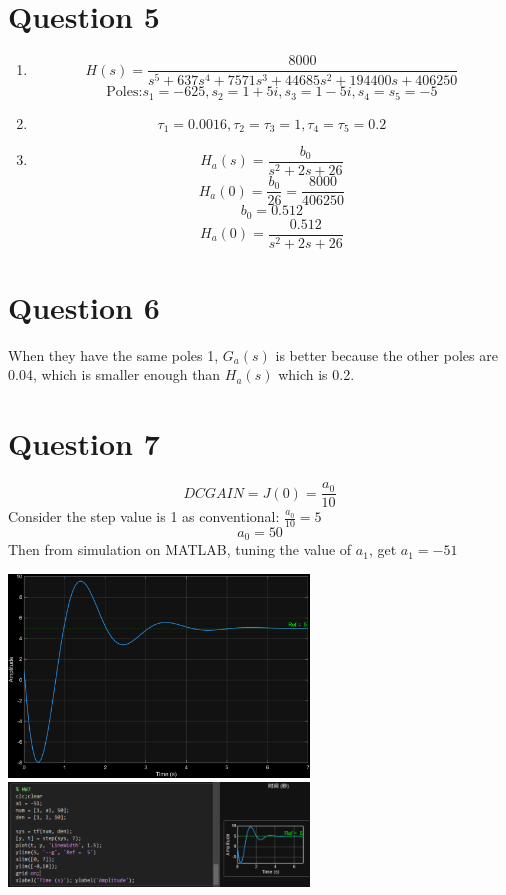\documentclass[12pt]{article}
\begin{document}
\section*{Question 5}
    \begin{enumerate}[label=\alph*]
        \item \[H(s) = \frac{8000}{s^5 + 637s^4 + 7571s^3 + 44685s^2 + 194400s +
            406250}\]
        \[\text{Poles:} s_1 = -625, s_2 = 1+5i, s_3 = 1-5i, s_4 = s_5 = -5\]

        \item \[\tau_1 = 0.0016, \tau_2 = \tau_3 = 1, \tau_4 = \tau_5 = 0.2\]

        \item \[H_a(s) = \frac{b_0}{s^2+2s+26}\]
        \[H_a(0) = \frac{b_0}{26} = \frac{8000}{406250}\]
        \[b_0 = 0.512\]
        \[H_a(0) = \frac{0.512}{s^2+2s+26}\]

    \end{enumerate}

\section*{Question 6}
    When they have the same poles 1, $G_a(s)$ is better because the other poles 
        are 0.04, which is smaller enough than $H_a(s)$ which is 0.2.

\section*{Question 7}

    \[DC GAIN = J(0) = \frac{a_0}{10}\]
    Consider the step value is 1 as conventional: $\frac{a_0}{10}  = 5$
    \[a_0 = 50\]
    Then from simulation on MATLAB, tuning the value of $a_1$, get $a_1 = -51$
    \begin{center}
        \includegraphics[width=0.6\textwidth]{Q7.png}
        \includegraphics[width=0.6\textwidth]{Q7m.png}
    \end{center}
\end{document}
